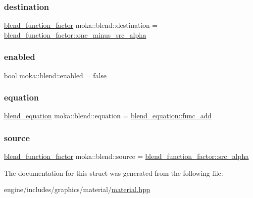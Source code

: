 \subsubsection{\texorpdfstring{destination}{destination}}
{\footnotesize\ttfamily \mbox{\hyperlink{namespacemoka_a631c77633ed9ed0c34a6632a8211a19d}{blend\+\_\+function\+\_\+factor}} moka\+::blend\+::destination = \mbox{\hyperlink{namespacemoka_a631c77633ed9ed0c34a6632a8211a19daa415ef353601f5e5d8a3e5ac06683703}{blend\+\_\+function\+\_\+factor\+::one\+\_\+minus\+\_\+src\+\_\+alpha}}}

\mbox{\label{structmoka_1_1blend_ab32b3e6763ad8210e06a5569f5a789ae}} 
\subsubsection{\texorpdfstring{enabled}{enabled}}
{\footnotesize\ttfamily bool moka\+::blend\+::enabled = false}

\mbox{\label{structmoka_1_1blend_aeb187f38046e0eacb02e82737c744f1a}} 
\subsubsection{\texorpdfstring{equation}{equation}}
{\footnotesize\ttfamily \mbox{\hyperlink{namespacemoka_acf03408f89c521244763fb5f8746ce16}{blend\+\_\+equation}} moka\+::blend\+::equation = \mbox{\hyperlink{namespacemoka_acf03408f89c521244763fb5f8746ce16ae356d88a1e5f1a9a32dcc057d706021a}{blend\+\_\+equation\+::func\+\_\+add}}}

\mbox{\label{structmoka_1_1blend_a61a0f7f6eecc7af34fd9b2b993b729c7}} 
\subsubsection{\texorpdfstring{source}{source}}
{\footnotesize\ttfamily \mbox{\hyperlink{namespacemoka_a631c77633ed9ed0c34a6632a8211a19d}{blend\+\_\+function\+\_\+factor}} moka\+::blend\+::source = \mbox{\hyperlink{namespacemoka_a631c77633ed9ed0c34a6632a8211a19daff175e9d424fcb3eef837a773872fb9e}{blend\+\_\+function\+\_\+factor\+::src\+\_\+alpha}}}



The documentation for this struct was generated from the following file\+:\begin{DoxyCompactItemize}
\item 
engine/includes/graphics/material/\mbox{\hyperlink{material_8hpp}{material.\+hpp}}\end{DoxyCompactItemize}
